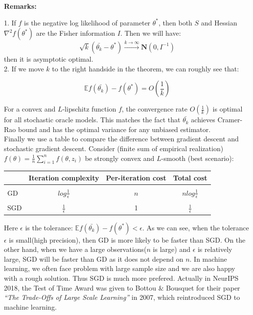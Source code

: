 \textbf{Remarks:}

1. If $f$ is the negative log likelihood of parameter $\theta^*$, then both $S$ and Hessian $\nabla^2f(\theta^*)$ are the Fisher information $I$. Then we will have:
$$
\sqrt{k}(\bar{\theta_k} - \theta^*) \xrightarrow{k \rightarrow \infty} \mathbf{N}(0,I^{-1})
$$
then it is asymptotic optimal.\\

2. If we move $k$ to the right handside in the theorem, we can roughly see that:

$$
\mathbb{E}f(\bar{\theta_k}) - f(\theta^*) = O(\frac{1}{k})
$$



 For a convex  and $L$-lipschitz function $f$, the convergence rate $O(\frac{1}{k})$ is optimal for all stochastic oracle models. This matches the fact that $\bar{\theta_k}$ achieves Cramer-Rao bound and has the optimal variance for any unbiased estimator.\\



Finally we use a table to compare the difference between gradient descent and stochastic gradient descent. Consider (finite sum of empirical realization) $f(\theta) = \frac{1}{n}\sum_{i=1}^{n}f(\theta,z_i)$ be strongly convex and $L$-smooth (best scenario):

\begin{table}[h!]
	\begin{center}
		\label{tab:table1}
		\begin{tabular}{l|c|c|c} %
			 & \textbf{Iteration complexity} & \textbf{Per-iteration cost} & \textbf{Total cost}\\
			\hline
			 & & &\\
			GD & $log{\frac{1}{\epsilon}}$ & $n$ & $nlog{\frac{1}{\epsilon}}$\\
			& & &\\
			SGD & $\frac{1}{\epsilon}$ & 1 & $\frac{1}{\epsilon}$\\
		\end{tabular}
	\end{center}
\end{table}

Here $\epsilon$ is the tolerance: $\mathbb{E}f(\bar{\theta_k}) - f(\theta^*) < \epsilon$. As we can see, when the tolerance $\epsilon$ is small(high precision), then GD is more likely to be faster than SGD. On the other hand, when we have a large observations($n$ is large) and $\epsilon$ is relatively large, SGD will be faster than GD as it does not depend on $n$. In machine learning, we often face problem with large sample size and we are also happy with a rough solution. Thus SGD is much more prefered. Actually in NeurIPS 2018, the Test of Time Award was given to Bottou $\&$ Bousquet for their paper \textit{“The Trade-Offs of Large Scale Learning”} in 2007, which reintroduced SGD to machine learning.\\

